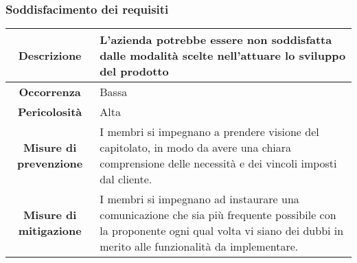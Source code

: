 \subsubsection{Soddisfacimento dei requisiti}
\begin{tabular}{|c|p{10cm}|}
\hline
\textbf{Descrizione} & L'azienda potrebbe essere non soddisfatta dalle modalità scelte nell'attuare lo sviluppo del prodotto\\
\hline
\textbf{Occorrenza} & Bassa \\
\hline
\textbf{Pericolosità} & Alta \\
\hline
\textbf{Misure di prevenzione} & I membri si impegnano a prendere visione del capitolato, in modo da avere una chiara comprensione delle necessità e dei vincoli imposti dal cliente. \\
\hline
\textbf{Misure di mitigazione} &  I membri si impegnano ad instaurare una comunicazione che sia più frequente possibile con la proponente ogni qual volta vi siano dei dubbi in merito alle funzionalità da implementare.\\
\hline
\end{tabular}